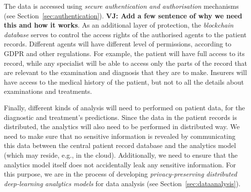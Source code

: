 The data is accessed using \emph{secure authentication and authorisation} mechanisms (see Section~\ref{sec:authentication}). \textbf{VJ: Add a few sentence of why we need this and how it works}. As an additional layer of protection, the \emph{blockchain database} serves to control the access rights of the authorised agents to the patient records. Different agents will have different level of permissions, according to GDPR and other regulations. For example, the patient will have full access to its record, while any specialist will be able to access only the parts of the record that are relevant to the examination and diagnosis that they are to make. Insurers will have access to the medical history of the patient, but not to all the details about examinations and treatments.

Finally, different kinds of analysis will need to performed on patient data, for the diagnostic and treatment's predictions. Since the data in the patient records is distributed, the analytics will also need to be performed in distributed way. We need to make sure that no sensitive information is revealed by communicating this data between the central patient record database and the analytics model (which may reside, e.g., in the cloud). Additionally, we need to ensure that the analytics model itself does not accidentally leak any sensitive information. For this purpose, we are in the process of developing \emph{privacy-preserving distributed deep-learning analytics models} for data analysis (see Section~\ref{sec:dataanalysis}).






